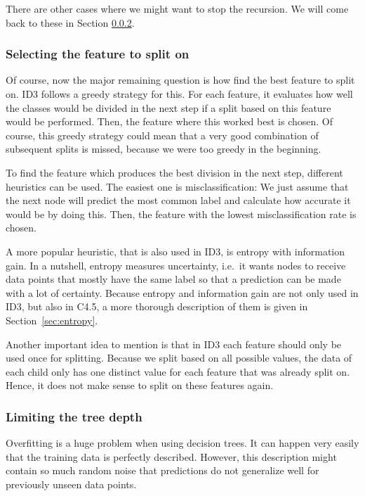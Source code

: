 \documentclass[a4paper]{article}
\begin{document}
There are other cases where we might want to stop the recursion. We will come back to these in Section \ref{subsec:id3-depth}.

\subsubsection{Selecting the feature to split on}

Of course, now the major remaining question is how find the best feature to split on. ID3 follows a greedy strategy for this. For each feature, it evaluates how well the classes would be divided in the next step if a split based on this feature would be performed. Then, the feature where this worked best is chosen. Of course, this greedy strategy could mean that a very good combination of subsequent splits is missed, because we were too greedy in the beginning.

To find the feature which produces the best division in the next step, different heuristics can be used. The easiest one is misclassification: We just assume that the next node will predict the most common label and calculate how accurate it would be by doing this. Then, the feature with the lowest misclassification rate is chosen.

A more popular heuristic, that is also used in ID3, is entropy with information gain. In a nutshell, entropy measures uncertainty, i.e.\ it wants nodes to receive data points that mostly have the same label so that a prediction can be made with a lot of certainty. Because entropy and information gain are not only used in ID3, but also in C4.5, a more thorough description of them is given in Section~\ref{sec:entropy}.

Another important idea to mention is that in ID3 each feature should only be used once for splitting. Because we split based on all possible values, the data of each child only has one distinct value for each feature that was already split on. Hence, it does not make sense to split on these features again.

\subsubsection{Limiting the tree depth}
\label{subsec:id3-depth}

Overfitting is a huge problem when using decision trees. It can happen very easily that the training data is perfectly described. However, this description might contain so much random noise that predictions do not generalize well for previously unseen data points.
\end{document}
